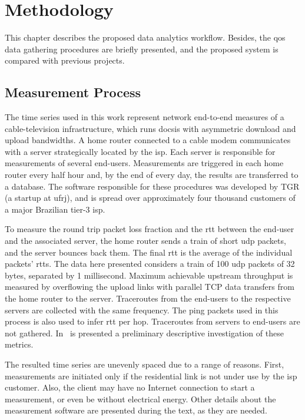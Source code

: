 \chapter{Methodology}
\label{chap:methodology}

This chapter describes the proposed data analytics workflow.
Besides, the \gls*{qos} data gathering procedures are briefly presented,
and the proposed system is compared with previous projects.

\section{Measurement Process}

The time series used in this work represent network end-to-end measures of a
cable-television infrastructure, which runs \gls*{docsis} with asymmetric download and
upload bandwidths. A home router connected to a cable modem communicates
with a server strategically located by the \gls*{isp}.
Each server is responsible for measurements of several end-users.
Measurements are triggered in
each home router every half hour and, by the end of every day,
the results are transferred to a database.
The software responsible for these procedures was
developed by TGR (a startup at \gls*{ufrj}),
and is spread over approximately four thousand customers of a major Brazilian
tier-3 \gls*{isp}.

To measure the round
trip packet loss fraction and the \gls*{rtt} between the end-user and the associated
server, the home router sends a train of short \gls*{udp} packets, and the server
bounces back them.
The final \gls*{rtt} is the average of the individual packets' \gls*{rtt}s.
The data here presented considers a train of 100 \gls*{udp} packets of 32 bytes,
separated by 1 millisecond.
Maximum achievable upstream throughput is measured by overflowing the upload
links with parallel TCP data transfers from the home router to the server.
Traceroutes from the end-users to the respective servers are collected with
the same frequency.
The ping packets used in this process is also used to infer \gls*{rtt} per hop.
Traceroutes from servers to end-users are not gathered.
In~\cite{a_preliminary_performance_measurement_study_of_residential_broadband_services_in_brazil}
is presented a preliminary descriptive investigation of these metrics.

The resulted time series are unevenly spaced due to a range of reasons. First,
measurements are initiated only if the residential link is not under use by the
\gls*{isp} customer. Also, the client may have no Internet connection to start a
measurement, or even be without electrical energy. Other details about the
measurement software are presented during the text, as they are needed.


